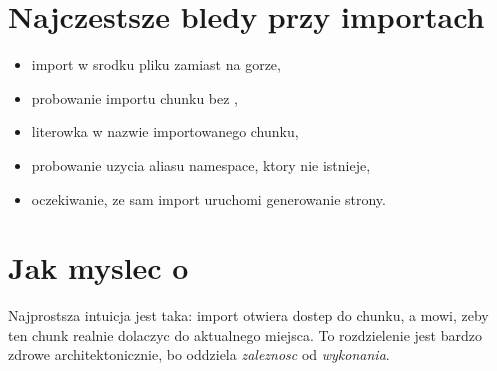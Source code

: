 \section{Najczestsze bledy przy importach}
\begin{itemize}
  \item import w srodku pliku zamiast na gorze,
  \item probowanie importu chunku bez ,
  \item literowka w nazwie importowanego chunku,
  \item probowanie uzycia aliasu namespace, ktory nie istnieje,
  \item oczekiwanie, ze sam import uruchomi generowanie strony.
\end{itemize}

\section{Jak myslec o }
Najprostsza intuicja jest taka: import otwiera dostep do chunku, a 
mowi, zeby ten chunk realnie dolaczyc do aktualnego miejsca. To rozdzielenie jest
bardzo zdrowe architektonicznie, bo oddziela \emph{zaleznosc} od \emph{wykonania}.
